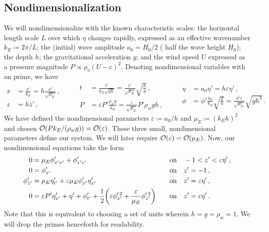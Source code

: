 \documentclass{jfm}
\renewcommand*{\epsilon}{\varepsilon}
\begin{document}
\subsection{\label{sec:nondim} Nondimensionalization}
We will nondimensionalize with the known characteristic scales: the
horizontal length scale $L$ over which $\eta$ changes
rapidly, expressed as an effective wavenumber $k_E \coloneqq 2 \pi/L$;
the (initial) wave amplitude $a_0 = H_0/2$ (\ie{} half the wave height
$H_0$); the depth $h$; the gravitational acceleration $g$; and the wind
speed $U$ expressed as a pressure magnitude $P \propto \rho_a (U-c)^2$.
Denoting nondimensional variables with an prime, we have
\begin{equation*}
  \begin{aligned}
  x &= \frac{x'}{k_E} = h \frac{x'}{\sqrt{\mu_E}}\,, \\
  z &= h z' \,,
  \end{aligned}
  \qquad
  \begin{aligned}
  t &= \frac{t'}{k_E\sqrt{g h}}
    = \frac{t'}{\sqrt{\mu_E}} \sqrt{\frac{h}{g}} \,, \\
  P &= \epsilon P' \frac{\rho_w g}{k_E}
    = \frac{\epsilon}{\sqrt{\mu_E}} P' \rho_w g h \,,
  \end{aligned}
  \qquad
  \begin{aligned}
  \eta &= a_0 \eta' = h \epsilon \eta' \,, \\
  \phi &= \phi'\frac{a_0}{k_E}\sqrt{\frac{g}{h}}
    = \frac{\phi'\epsilon}{\sqrt{\mu_E}}\sqrt{g h^3} \,.
  \end{aligned}
\end{equation*}
We have defined the nondimensional parameters $\epsilon \coloneqq a_0/h$
and $\mu_E \coloneqq (k_E h)^2$ and chosen $\order{P k_E/(\rho_w g)} =
\order{\epsilon}$.
These three small, nondimensional parameters define our system.
We will later require $\order{\epsilon} = \order{\mu_E}$.
Now, our nondimensional equations take the form
\begin{alignat}{2}
  0 &= \mu_E \phi'_{x'x'} + \phi'_{z'z'} &&\qq{on}
    -1 < z' < \epsilon \eta' \,, \label{eq:laplace_nondim} \\
  0 &= \phi'_{z'} &&\qq{on} z'=-1 \,, \label{eq:bottom_bc_nondim} \\
  \phi'_{z'} &= \mu_E \eta'_{t'} +
    \epsilon \mu_E \phi'_{x'} \eta'_{x'} &&\qq{on} z' = \epsilon \eta' \,,
    \label{eq:kinematic_bc_nondim} \\
  0 &= \epsilon P' \eta'_{x'} +  \eta' + \phi'_{t'} + \frac{1}{2}
    \pqty{\epsilon \phi_{x'}^{\prime \, 2} + \frac{\epsilon}{\mu_E}
    \phi_{z'}^{\prime \, 2}} &&\qq{on} z'= \epsilon \eta' \,.
    \label{eq:dynamic_bc_nondim}
\end{alignat}
Note that this is equivalent to choosing a set of units wherein $h = g =
\rho_w = 1$.
We will drop the primes henceforth for readability.
\end{document}

